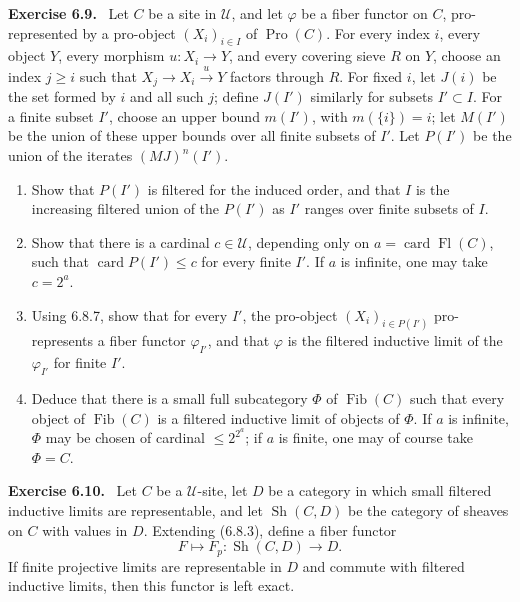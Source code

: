 \documentclass[11pt]{article}
\newcommand{\U}{\mathcal{U}}
\newcommand{\Ffib}{\operatorname{Fib}}
\newcommand{\card}{\operatorname{card}}
\newenvironment{remarktext}[1]{\par\medskip\noindent\textbf{#1.}\ }{\par\medskip}
\begin{document}
\begin{remarktext}{Exercise 6.9}
Let \(C\) be a site in \(\U\), and let \(\varphi\) be a fiber functor on \(C\), pro-represented by a pro-object \((X_i)_{i\in I}\) of \(\operatorname{Pro}(C)\). For every index \(i\), every object \(Y\), every morphism \(u:X_i\to Y\), and every covering sieve \(R\) on \(Y\), choose an index \(j\ge i\) such that \(X_j\to X_i\xrightarrow{u}Y\) factors through \(R\). For fixed \(i\), let \(J(i)\) be the set formed by \(i\) and all such \(j\); define \(J(I')\) similarly for subsets \(I'\subset I\). For a finite subset \(I'\), choose an upper bound \(m(I')\), with \(m(\{i\})=i\); let \(M(I')\) be the union of these upper bounds over all finite subsets of \(I'\). Let \(P(I')\) be the union of the iterates \((MJ)^n(I')\).
\begin{enumerate}[label=\alph*)]
\item Show that \(P(I')\) is filtered for the induced order, and that \(I\) is the increasing filtered union of the \(P(I')\) as \(I'\) ranges over finite subsets of \(I\).
\item Show that there is a cardinal \(c\in\U\), depending only on \(a=\card\operatorname{Fl}(C)\), such that \(\card P(I')\le c\) for every finite \(I'\). If \(a\) is infinite, one may take \(c=2^a\).
\item Using 6.8.7, show that for every \(I'\), the pro-object \((X_i)_{i\in P(I')}\) pro-represents a fiber functor \(\varphi_{I'}\), and that \(\varphi\) is the filtered inductive limit of the \(\varphi_{I'}\) for finite \(I'\).
\item Deduce that there is a small full subcategory \(\Phi\) of \(\Ffib(C)\) such that every object of \(\Ffib(C)\) is a filtered inductive limit of objects of \(\Phi\). If \(a\) is infinite, \(\Phi\) may be chosen of cardinal \(\le 2^{2^a}\); if \(a\) is finite, one may of course take \(\Phi=C\).
\end{enumerate}
\end{remarktext}

\begin{remarktext}{Exercise 6.10}
Let \(C\) be a \(\U\)-site, let \(D\) be a category in which small filtered inductive limits are representable, and let \(\operatorname{Sh}(C,D)\) be the category of sheaves on \(C\) with values in \(D\). Extending (6.8.3), define a fiber functor
\begin{equation*}
F\longmapsto F_p:\operatorname{Sh}(C,D)\longrightarrow D.\tag{6.10.1}
\end{equation*}
If finite projective limits are representable in \(D\) and commute with filtered inductive limits, then this functor is left exact.
\end{remarktext}
\end{document}
